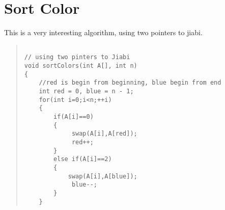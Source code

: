 \section{Sort Color}

This is a very interesting algorithm, using two pointers to jiabi.

\begin{quote}
\begin{verbatim}

// using two pinters to Jiabi
void sortColors(int A[], int n) 
{
	//red is begin from beginning, blue begin from end
	int red = 0, blue = n - 1;
	for(int i=0;i<n;++i)
	{
		if(A[i]==0)
		{
			 swap(A[i],A[red]);
			 red++;
		}
		else if(A[i]==2)
		{
			swap(A[i],A[blue]);
			 blue--;
		}
	}

\end{verbatim}
\end{quote}